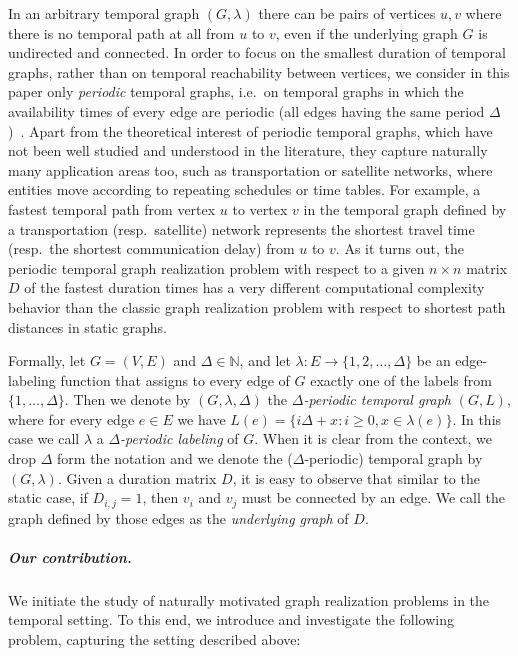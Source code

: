 \documentclass[a4paper,UKenglish,cleveref, autoref, thm-restate,anonymous]{lipics-v2021}
\begin{document}
In an arbitrary temporal graph $(G,\lambda)$ there can be pairs of vertices $u,v$ where there is no temporal path at all from $u$ to $v$, even if the underlying graph $G$ is undirected and connected. 
In order to focus on the smallest duration of temporal graphs, rather than on temporal reachability between vertices, we consider in this paper only \emph{periodic} temporal graphs, i.e.~on temporal graphs in which the availability times of every edge are periodic (all edges having the same period $\Delta$)~\cite{casteigts2012time}. 
Apart from the theoretical interest of periodic temporal graphs, which have not been well studied and understood in the literature, they capture naturally many application areas too, such as transportation or satellite networks, where entities move according to repeating schedules or time tables. For example, a fastest temporal path from vertex $u$ to vertex $v$ in the temporal graph defined by a transportation (resp.~satellite) network represents the shortest travel time (resp.~the shortest communication delay) from $u$ to $v$. 
As it turns out, the periodic temporal graph realization problem with respect to a given $n \times n$ matrix $D$ of the fastest duration times has a very different computational complexity behavior than the classic graph realization problem with respect to shortest path distances in static graphs. 



Formally, let $G=(V,E)$ and $\Delta\in \mathbb{N}$, and let $\lambda: E \rightarrow \{1,2,\ldots,\Delta\}$ be an edge-labeling function that assigns to every edge of $G$ exactly one of the labels from $\{1,\ldots,\Delta\}$. 
Then we denote by $(G,\lambda,\Delta)$ the \emph{$\Delta$-periodic temporal graph} $(G,L)$, where for every edge $e\in E$ we have $L(e)=\{i\Delta + x : i\geq 0, x\in \lambda(e)\}$. 
In this case we call $\lambda$ a \emph{$\Delta$-periodic labeling} of $G$. 
When it is clear from the context, we drop $\Delta$ form the notation and 
we denote the ($\Delta$-periodic) temporal graph by $(G,\lambda)$.
Given a duration matrix $D$, it is easy to observe that similar to the static case, if $D_{i,j}=1$, then $v_i$ and $v_j$ must be connected by an edge. We call the graph defined by those edges as the \emph{underlying graph} of $D$.





\subparagraph{Our contribution.}
We initiate the study of naturally motivated graph realization problems in the temporal setting. To this end, we introduce and investigate the following problem, capturing the setting described above:
	
\end{document}
